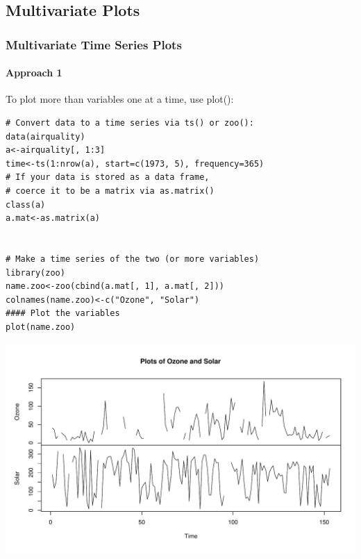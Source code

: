 

\subsection{Multivariate Plots}


\begin{frame}
 \frametitle{Multivariate Time Series Plots}
 \framesubtitle{Approach 1}

To plot more than variables one at a time, use \ttfamily plot(): \normalfont 
	\begin{lstlisting}
# Convert data to a time series via ts() or zoo():
data(airquality)
a<-airquality[, 1:3]
time<-ts(1:nrow(a), start=c(1973, 5), frequency=365)
# If your data is stored as a data frame,
# coerce it to be a matrix via as.matrix()
class(a)
a.mat<-as.matrix(a)


# Make a time series of the two (or more variables)
library(zoo)
name.zoo<-zoo(cbind(a.mat[, 1], a.mat[, 2]))
colnames(name.zoo)<-c("Ozone", "Solar")
#### Plot the variables
plot(name.zoo)
	\end{lstlisting}

       \begin{center}
         \includegraphics[width=1\textwidth]{images/Mtvsplot1.pdf}
        \end{center}
\end{frame}

